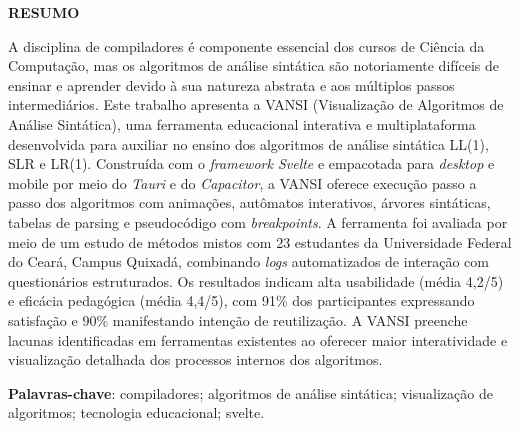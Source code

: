\thispagestyle{empty}

\onehalfspacing

\setlength{\parindent}{1.25cm}

\begin{center}
    \textbf{RESUMO}
\end{center}

\vspace{0.5cm}

\noindent A disciplina de compiladores é componente essencial dos cursos de Ciência da Computação, mas os algoritmos de análise sintática são notoriamente difíceis de ensinar e aprender devido à sua natureza abstrata e aos múltiplos passos intermediários. Este trabalho apresenta a VANSI (Visualização de Algoritmos de Análise Sintática), uma ferramenta educacional interativa e multiplataforma desenvolvida para auxiliar no ensino dos algoritmos de análise sintática LL(1), SLR e LR(1). Construída com o \textit{framework Svelte} e empacotada para \textit{desktop} e mobile por meio do \textit{Tauri} e do \textit{Capacitor}, a VANSI oferece execução passo a passo dos algoritmos com animações, autômatos interativos, árvores sintáticas, tabelas de parsing e pseudocódigo com \textit{breakpoints}. A ferramenta foi avaliada por meio de um estudo de métodos mistos com 23 estudantes da Universidade Federal do Ceará, Campus Quixadá, combinando \textit{logs} automatizados de interação com questionários estruturados. Os resultados indicam alta usabilidade (média 4,2/5) e eficácia pedagógica (média 4,4/5), com 91\% dos participantes expressando satisfação e 90\% manifestando intenção de reutilização. A VANSI preenche lacunas identificadas em ferramentas existentes ao oferecer maior interatividade e visualização detalhada dos processos internos dos algoritmos.

\vspace{0.5cm}

\noindent\textbf{Palavras-chave}: compiladores; algoritmos de análise sintática; visualização de algoritmos; tecnologia educacional; svelte.
